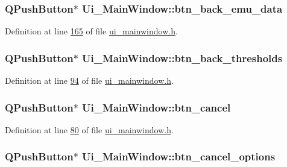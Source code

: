 \hypertarget{a00027_ab6199bde688a9b2e91e192278190dda7}{
\subsubsection[{btn\+\_\+back\+\_\+emu\+\_\+data}]{\setlength{\rightskip}{0pt plus 5cm}Q\+Push\+Button$\ast$ Ui\+\_\+\+Main\+Window\+::btn\+\_\+back\+\_\+emu\+\_\+data}}\label{a00027_ab6199bde688a9b2e91e192278190dda7}


Definition at line \hyperlink{a00052_source_l00165}{165} of file \hyperlink{a00052_source}{ui\+\_\+mainwindow.\+h}.

\hypertarget{a00027_a5a4e0ac94bd22955cc41bcc276a04278}{
\subsubsection[{btn\+\_\+back\+\_\+thresholds}]{\setlength{\rightskip}{0pt plus 5cm}Q\+Push\+Button$\ast$ Ui\+\_\+\+Main\+Window\+::btn\+\_\+back\+\_\+thresholds}}\label{a00027_a5a4e0ac94bd22955cc41bcc276a04278}


Definition at line \hyperlink{a00052_source_l00094}{94} of file \hyperlink{a00052_source}{ui\+\_\+mainwindow.\+h}.

\hypertarget{a00027_a26ea4040157d183322b8c1e5d7a55c9f}{
\subsubsection[{btn\+\_\+cancel}]{\setlength{\rightskip}{0pt plus 5cm}Q\+Push\+Button$\ast$ Ui\+\_\+\+Main\+Window\+::btn\+\_\+cancel}}\label{a00027_a26ea4040157d183322b8c1e5d7a55c9f}


Definition at line \hyperlink{a00052_source_l00080}{80} of file \hyperlink{a00052_source}{ui\+\_\+mainwindow.\+h}.

\hypertarget{a00027_a39d7e34aed8750622569f0819dd7c8c2}{
\subsubsection[{btn\+\_\+cancel\+\_\+options}]{\setlength{\rightskip}{0pt plus 5cm}Q\+Push\+Button$\ast$ Ui\+\_\+\+Main\+Window\+::btn\+\_\+cancel\+\_\+options}}\label{a00027_a39d7e34aed8750622569f0819dd7c8c2}


